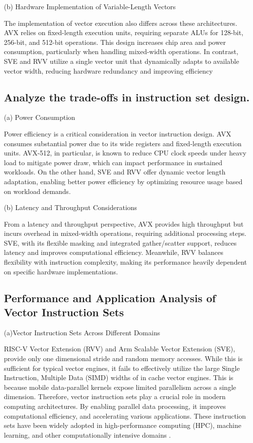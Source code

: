 \documentclass[conference]{IEEEtran}
\begin{document}
(b) Hardware Implementation of Variable-Length Vectors

The implementation of vector execution also differs across these architectures. AVX relies on fixed-length execution units, requiring separate ALUs for 128-bit, 256-bit, and 512-bit operations. This design increases chip area and power consumption, particularly when handling mixed-width operations\cite{b3}. In contrast, SVE and RVV utilize a single vector unit that dynamically adapts to available vector width, reducing hardware redundancy and improving efficiency\cite{b5}

\subsection{ Analyze the trade-offs in instruction set design.}
(a) Power Consumption

Power efficiency is a critical consideration in vector instruction design. AVX consumes substantial power due to its wide registers and fixed-length execution units. AVX-512, in particular, is known to reduce CPU clock speeds under heavy load to mitigate power draw, which can impact performance in sustained workloads\cite{b3}. On the other hand, SVE and RVV offer dynamic vector length adaptation, enabling better power efficiency by optimizing resource usage based on workload demands\cite{b4}.

(b) Latency and Throughput Considerations

From a latency and throughput perspective, AVX provides high throughput but incurs overhead in mixed-width operations, requiring additional processing steps\cite{b1}. SVE, with its flexible masking and integrated gather/scatter support, reduces latency and improves computational efficiency\cite{b5}. Meanwhile, RVV balances flexibility with instruction complexity, making its performance heavily dependent on specific hardware implementations\cite{b6}.


\subsection{Performance and Application Analysis of Vector Instruction Sets}

(a)Vector Instruction Sets Across Different Domains

RISC-V Vector Extension (RVV) and Arm Scalable Vector Extension (SVE), provide only one dimensional stride and random memory accesses. While this is sufficient for typical vector engines, it fails to effectively utilize the large Single Instruction, Multiple Data (SIMD) widths of in cache vector engines. This is because mobile data-parallel kernels expose limited parallelism across a single dimension. Therefore, vector instruction sets play a crucial role in modern computing architectures. By enabling parallel data processing, it improves computational efficiency, and accelerating various applications. These instruction sets have been widely adopted in high-performance computing (HPC), machine learning, and other computationally intensive domains \cite{b7}. 
\end{document}
